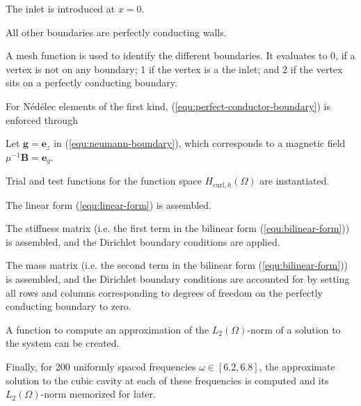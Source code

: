 \documentclass[11pt, a4paper]{article}
\begin{document}
The inlet is introduced at $x = 0$.


All other boundaries are perfectly conducting walls.


A mesh function is used to identify the different boundaries. It evaluates to
0, if a vertex is not on any boundary; 1 if the vertex is a the inlet; and 2 if
the vertex sits on a perfectly conducting boundary.


For Nédélec elements of the first kind, (\ref{equ:perfect-conductor-boundary})
is enforced through


Let $\mathbf{g} = \mathbf{e}_z$ in (\ref{equ:neumann-boundary}), which corresponds
to a magnetic field $\mu^{-1} \mathbf{B} = \mathbf{e}_y$.


Trial and test functions for the function space $H_{\mathrm{curl},h}(\Omega)$ are instantiated.


The linear form (\ref{equ:linear-form}) is assembled.


The stiffness matrix (i.e. the first term in the bilinear form (\ref{equ:bilinear-form}))
is assembled, and the Dirichlet boundary conditions are applied.


The mass matrix (i.e. the second term in the bilinear form (\ref{equ:bilinear-form}))
is assembled, and the Dirichlet boundary conditions are accounted for by setting
all rows and columns corresponding to degrees of freedom on the perfectly conducting
boundary to zero.


A function to compute an approximation of the $L_2(\Omega)$-norm of a solution
to the system can be created.


Finally, for 200 uniformly spaced frequencies $\omega \in [6.2, 6.8]$, the 
approximate solution to the cubic cavity at each of these frequencies is
computed and its $L_2(\Omega)$-norm memorized for later.

\end{document}
